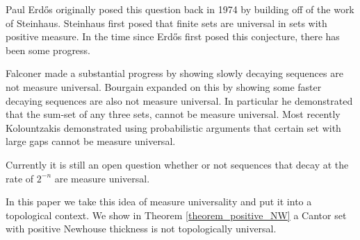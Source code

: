 Paul Erd\H{o}s originally posed this question back in 1974 by building off of the work of Steinhaus.  Steinhaus\cite{Steinhaus} first posed that finite sets are universal in sets with positive measure.  In the time since Erd\H{o}s first posed this conjecture, there has been some progress.

Falconer \cite{Falconer} made a substantial progress by showing slowly decaying sequences are not measure universal.  Bourgain \cite{Bourgain} expanded on this by showing some faster decaying sequences are also not measure universal.  In particular he demonstrated that the sum-set of any three sets, cannot be measure universal.  Most recently Kolountzakis \cite{Kolo} demonstrated using probabilistic arguments that certain set with large gaps cannot be measure universal.  

Currently it is still an open question whether or not sequences that decay at the rate of $2^{-n}$ are measure universal. 


In this paper we take this idea of measure universality and put it into a topological context.  We show in Theorem \ref{theorem_positive_NW} a Cantor set with positive Newhouse thickness is not topologically universal.



